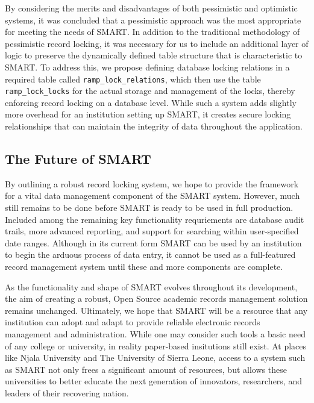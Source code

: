 \documentclass[12pt]{article}
\newcommand{\code}[1]{\texttt{#1}}
\begin{document}
By considering the merits and disadvantages of both pessimistic and optimistic systems, it was concluded that a pessimistic approach was the most appropriate for meeting the needs of SMART. In addition to the traditional methodology of pessimistic record locking, it was necessary for us to include an additional layer of logic to preserve the dynamically defined table structure that is characteristic to SMART. To address this, we propose defining database locking relations in a required table called \code{ramp\_lock\_relations}, which then use the table \code{ramp\_lock\_locks} for the actual storage and management of the locks, thereby enforcing record locking on a database level. While such a system adds slightly more overhead for an institution setting up SMART, it creates secure locking relationships that can maintain the integrity of data throughout the application.

\subsection{The Future of SMART}
By outlining a robust record locking system, we hope to provide the framework for a vital data management component of the SMART system. However, much still remains to be done before SMART is ready to be used in full production. Included among the remaining key functionality requriements are database audit trails, more advanced reporting, and support for searching within user-specified date ranges. Although in its current form SMART can be used by an institution to begin the arduous process of data entry, it cannot be used as a full-featured record management system until these and more components are complete.

As the functionality and shape of SMART evolves throughout its development, the aim of creating a robust, Open Source academic records management solution remains unchanged. Ultimately, we hope that SMART will be a resource that any institution can adopt and adapt to provide reliable electronic records management and administration. While one may consider such tools a basic need of any college or university, in reality paper-based insitutions still exist. At places like Njala University and The University of Sierra Leone, access to a system such as SMART not only frees a significant amount of resources, but allows these universities to better educate the next generation of innovators, researchers, and leaders of their recovering nation.
\end{document}
